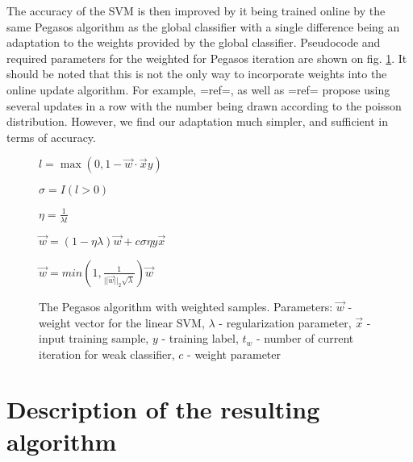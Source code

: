 The accuracy of the SVM is then improved by it being trained online by the same Pegasos algorithm as the global classifier with a single difference being an adaptation to the weights provided by the global classifier. Pseudocode and required parameters for the weighted for Pegasos iteration are shown on fig. \ref{PegasosAl}. It should be noted that this is not the only way to incorporate weights into the online update algorithm. For example, {{=ref=}}, as well as {{=ref=}} propose using several updates in a row with the number being drawn according to the poisson distribution. However, we find our adaptation much simpler, and sufficient in terms of accuracy. 
\begin{figure}[t]

\begin{algorithmic}


$l=\max (0, 1-\vec{w}\cdot\vec{x}y)$

$\sigma=I(l>0)$

$\eta=\frac{1}{\lambda{t}}$

$\vec{w}=(1-\eta\lambda)\vec{w}+{c}\sigma\eta{y}{\vec{x}}$

$\vec{w}=min\left(1,\frac{1}{||\vec{w}||_2\sqrt{\lambda}}\right)\vec{w} $
\EndFunction
\end{algorithmic}
\caption{The Pegasos algorithm with weighted samples. Parameters: $\vec{w}$ - weight vector for the linear SVM, $\lambda$ - regularization parameter, $\vec{x}$ -input training sample, $y$ - training label, $t_w$ - number of current iteration for weak classifier, $c$ - weight parameter 
}
\label{PegasosAl}
\end{figure}
\section{Description of the resulting algorithm}

